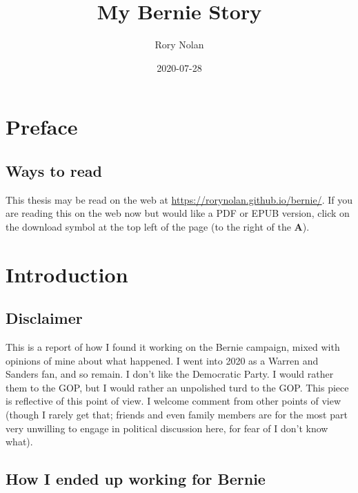 \documentclass[]{book}
\title{My Bernie Story}
\author{Rory Nolan}
\date{2020-07-28}
\begin{document}
\maketitle

{
\setcounter{tocdepth}{1}
\tableofcontents
}
\hypertarget{preface}{%
\chapter*{Preface}\label{preface}}

\hypertarget{ways-to-read}{%
\section*{Ways to read}\label{ways-to-read}}

This thesis may be read on the web at \url{https://rorynolan.github.io/bernie/}. If you are reading this on the web now but would like a PDF or EPUB version, click on the download symbol at the top left of the page (to the right of the \textbf{A}).

\hypertarget{intro}{%
\chapter{Introduction}\label{intro}}

\hypertarget{disclaimer}{%
\section{Disclaimer}\label{disclaimer}}

This is a report of how I found it working on the Bernie campaign, mixed with opinions of mine about what happened. I went into 2020 as a Warren and Sanders fan, and so remain. I don't like the Democratic Party. I would rather them to the GOP, but I would rather an unpolished turd to the GOP. This piece is reflective of this point of view. I welcome comment from other points of view (though I rarely get that; friends and even family members are for the most part very unwilling to engage in political discussion here, for fear of I don't know what).

\hypertarget{how-i-ended-up-working-for-bernie}{%
\section{How I ended up working for Bernie}\label{how-i-ended-up-working-for-bernie}}
\end{document}
